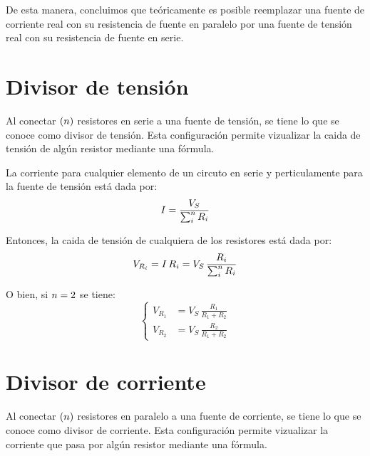 \documentclass[a5paper,12pt,twoside]{book}
\begin{document}
De esta manera, concluimos que teóricamente es posible reemplazar una fuente de corriente real con su resistencia de fuente en paralelo por una fuente de tensión real con su resistencia de fuente en serie.


\section{Divisor de tensión}

Al conectar $(n)$ resistores en serie a una fuente de tensión, se tiene lo que se conoce como divisor de tensión. Esta configuración permite vizualizar la caida de tensión de algún resistor mediante una fórmula.

\begin{center}
    \def\svgwidth{0.5\linewidth}
    
\end{center}

La corriente para cualquier elemento de un circuto en serie y perticulamente para la fuente de tensión está dada por:
\begin{equation*}
    I = \frac{V_S}{\sum_i^n R_i}
\end{equation*}

Entonces, la caida de tensión de cualquiera de los resistores está dada por:
\begin{equation*}
    V_{R_i} = I \, R_i = V_S \, \frac{R_i}{\sum_i^n R_i}
\end{equation*}

O bien, si $n=2$ se tiene:
\begin{equation*}
    \left\{
    \begin{aligned}
        V_{R_1} &= V_S \, \frac{R_1}{R_1 + R_2}
        \\[1ex]
        V_{R_2} &= V_S \, \frac{R_2}{R_1 + R_2}
    \end{aligned}
    \right.
\end{equation*}


\section{Divisor de corriente}

Al conectar $(n)$ resistores en paralelo a una fuente de corriente, se tiene lo que se conoce como divisor de corriente. Esta configuración permite vizualizar la corriente que pasa por algún resistor mediante una fórmula.

\begin{center}
    \def\svgwidth{0.5\linewidth}
    
\end{center}
\end{document}
